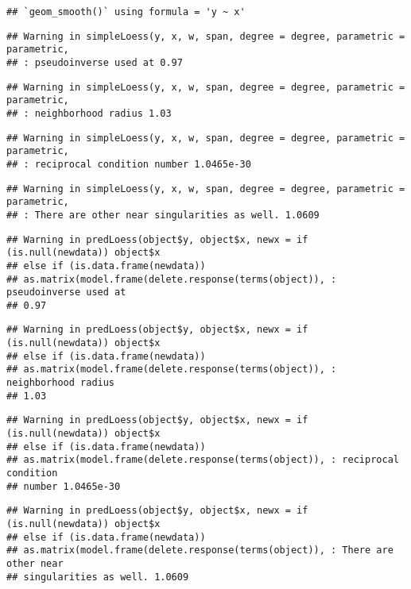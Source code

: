\documentclass[
]{article}
\begin{document}
\begin{verbatim}
## `geom_smooth()` using formula = 'y ~ x'
\end{verbatim}

\begin{verbatim}
## Warning in simpleLoess(y, x, w, span, degree = degree, parametric = parametric,
## : pseudoinverse used at 0.97
\end{verbatim}

\begin{verbatim}
## Warning in simpleLoess(y, x, w, span, degree = degree, parametric = parametric,
## : neighborhood radius 1.03
\end{verbatim}

\begin{verbatim}
## Warning in simpleLoess(y, x, w, span, degree = degree, parametric = parametric,
## : reciprocal condition number 1.0465e-30
\end{verbatim}

\begin{verbatim}
## Warning in simpleLoess(y, x, w, span, degree = degree, parametric = parametric,
## : There are other near singularities as well. 1.0609
\end{verbatim}

\begin{verbatim}
## Warning in predLoess(object$y, object$x, newx = if (is.null(newdata)) object$x
## else if (is.data.frame(newdata))
## as.matrix(model.frame(delete.response(terms(object)), : pseudoinverse used at
## 0.97
\end{verbatim}

\begin{verbatim}
## Warning in predLoess(object$y, object$x, newx = if (is.null(newdata)) object$x
## else if (is.data.frame(newdata))
## as.matrix(model.frame(delete.response(terms(object)), : neighborhood radius
## 1.03
\end{verbatim}

\begin{verbatim}
## Warning in predLoess(object$y, object$x, newx = if (is.null(newdata)) object$x
## else if (is.data.frame(newdata))
## as.matrix(model.frame(delete.response(terms(object)), : reciprocal condition
## number 1.0465e-30
\end{verbatim}

\begin{verbatim}
## Warning in predLoess(object$y, object$x, newx = if (is.null(newdata)) object$x
## else if (is.data.frame(newdata))
## as.matrix(model.frame(delete.response(terms(object)), : There are other near
## singularities as well. 1.0609
\end{verbatim}
\end{document}
